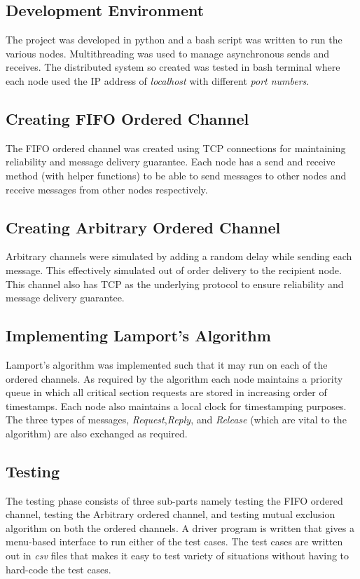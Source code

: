 \documentclass[a4paper, 12pt]{article}
\begin{document}
		\subsection{Development Environment}
			The project was developed in python and a bash script was written to run the various nodes. Multithreading was used to manage asynchronous sends and receives.  The distributed system so created was tested in bash terminal where each node used the IP address of \textit{localhost} with different \textit{port numbers}.
			
		\subsection{Creating FIFO Ordered Channel}
			The FIFO ordered channel was created using TCP connections for maintaining reliability and message delivery guarantee. Each node has a send and receive method (with helper functions) to be able to send messages to other nodes and receive messages from other nodes respectively.
			
		\subsection{Creating Arbitrary Ordered Channel}
			Arbitrary channels were simulated by adding a random delay while sending each message. This effectively simulated out of order delivery to the recipient node. This channel also has TCP as the underlying protocol to ensure reliability and message delivery guarantee.
			
		\subsection{Implementing Lamport's Algorithm}
			Lamport's algorithm was implemented such that it may run on each of the ordered channels. As required by the algorithm each node maintains a priority queue in which all critical section requests are stored in increasing order of timestamps. Each node also maintains a local clock for timestamping purposes. The three types of messages, \textit{Request},\textit{Reply}, and \textit{Release} (which are vital to the algorithm) are also exchanged as required.
			
		\subsection{Testing}
			The testing phase consists of three sub-parts namely testing the FIFO ordered channel, testing the Arbitrary ordered channel, and testing mutual exclusion algorithm on both the ordered channels. A driver program is written that gives a menu-based interface to run either of the test cases. The test cases are written out in \textit{csv} files that makes it easy to test variety of situations without having to hard-code the test cases. 
			
\end{document}
